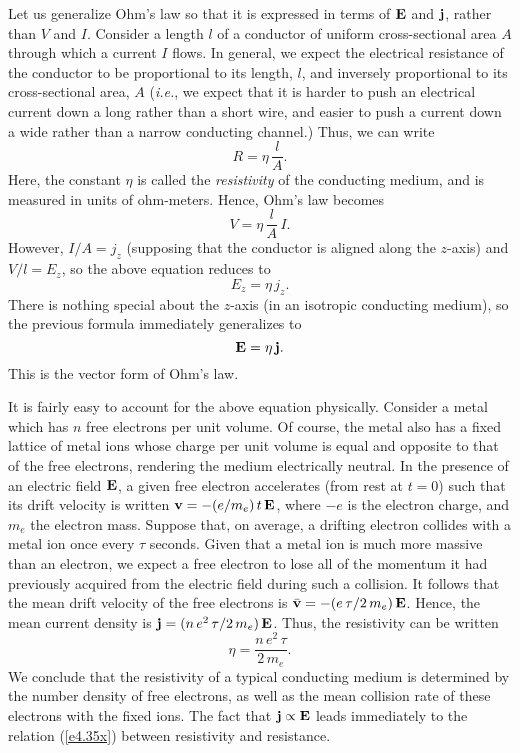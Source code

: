 Let us generalize Ohm's law so that it is expressed in terms
of ${\bf E}$ and ${\bf j}$, rather than $V$ and  $I$. Consider a length 
$l$ of a  conductor of uniform cross-sectional area $A$ through which a current
$I$ flows. In general, we expect the electrical
resistance of the conductor to be proportional to its length, $l$, and inversely 
proportional to its cross-sectional area, $A$ ({\em i.e.}, we expect that it is harder to push an electrical
 current down a long
rather than a short wire, and  easier to push a current down a wide rather
than a narrow conducting channel.) Thus, we can write
\begin{equation}\label{e4.35x}
R = \eta\, \frac{l}{A}.
\end{equation}
Here, the constant $\eta$ is called the {\em resistivity}\/ of the conducting medium, and is measured in
units of ohm-meters. Hence, Ohm's law becomes
\begin{equation}
V = \eta\, \frac{l}{A}\, I.
\end{equation}
However, $I/A = j_z$ (supposing that the conductor is aligned along the $z$-axis)
and $V/l = E_z$, so the above equation reduces to
\begin{equation}
E_z = \eta \,j_z.
\end{equation}
There is nothing special about the $z$-axis (in an isotropic conducting medium), so the
previous formula immediately generalizes to 
\begin{equation}\label{e5.38}
{\bf E} = \eta \,{\bf j}.
\end{equation}
This is the vector form of Ohm's law. 

It is fairly easy to account for the above equation physically. Consider a metal
which has $n$ free electrons per unit volume. Of course, the metal also
has a fixed lattice of metal ions whose charge per unit volume is equal and
opposite to that of the free electrons, rendering the medium electrically neutral.
In the presence of an electric field ${\bf E}$, a given free electron accelerates
(from rest at $t=0$) such that its drift velocity is written ${\bf v} = -(e/m_e)\,t\,{\bf E}$,
where $-e$ is the electron charge, and $m_e$ the electron mass. Suppose
that, on average, a drifting electron collides with a metal ion once every $\tau$
seconds. Given that a metal ion is much more massive than an electron,
we expect a free electron to lose all of the momentum it had previously acquired from
the electric field during such a collision.
 It follows that the mean drift  velocity of the free electrons is
$\bar{\bf v} = -(e\,\tau/2\,m_e)\,{\bf E}$. Hence, the mean current density
is ${\bf j} = (n\,e^2\,\tau/2\,m_e)\,{\bf E}$. Thus, the resistivity
can be written
\begin{equation}
\eta = \frac{n\,e^2\,\tau}{2\,m_e}.
\end{equation}
We conclude that the resistivity of a typical conducting medium is determined
by the number density of free electrons, as well as the mean collision
rate of these electrons with the  fixed ions. The fact that ${\bf j}\propto {\bf E}$ leads immediately to the relation (\ref{e4.35x}) between resistivity and
resistance.

